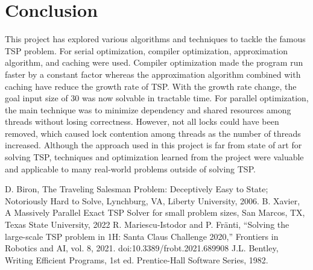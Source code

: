 \documentclass[conference]{IEEEtran}
\begin{document}
\section{Conclusion}
This project has explored various algorithms and techniques to tackle the famous TSP problem. For serial optimization, compiler optimization, approximation algorithm, and caching were used. Compiler optimization made the program run faster by a constant factor whereas the approximation algorithm combined with caching have reduce the growth rate of TSP. With the growth rate change, the goal input size of 30 was now solvable in tractable time. For parallel optimization, the main technique was to minimize dependency and shared resources among threads without losing correctness. However, not all locks could have been removed, which caused lock contention among threads as the number of threads increased. Although the approach used in this project is far from state of art for solving TSP, techniques and optimization learned from the project were valuable and applicable to many real-world problems outside of solving TSP.







\begin{thebibliography}{00}
 D. Biron, The Traveling Salesman Problem: Deceptively Easy to State; Notoriously Hard to Solve, Lynchburg, VA, Liberty University, 2006.
 B. Xavier, A Massively Parallel Exact TSP Solver for small problem sizes, San Marcos, TX, Texas State University, 2022
 R. Mariescu-Istodor and P. Fränti, “Solving the large-scale TSP problem in 1H: Santa Claus Challenge 2020,” Frontiers in Robotics and AI, vol. 8, 2021. doi:10.3389/frobt.2021.689908 
 J.L. Bentley, Writing Efficient Programs, 1st ed. Prentice-Hall Software Series, 1982.
\end{thebibliography}
\vspace{12pt}
\end{document}
